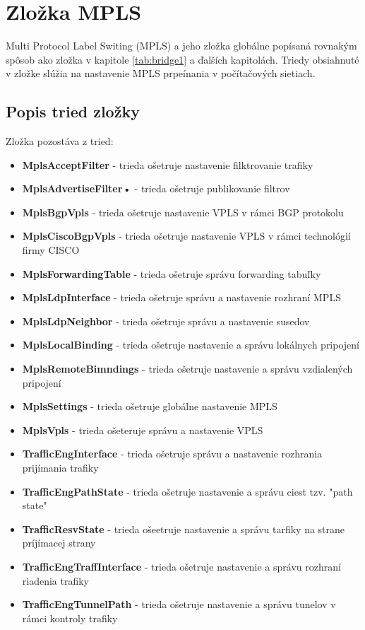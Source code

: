 \section{Zložka MPLS}
Multi Protocol Label Switing (MPLS) a jeho zložka globálne popísaná rovnakým spôsob ako zložka v kapitole \ref{tab:bridge1} a ďalších kapitolách. Triedy obsiahnuté v zložke slúžia na nastavenie MPLS prpeínania v počítačových sietiach.
\subsection{Popis tried zložky}
Zložka pozostáva z tried:
\begin{itemize}
\item \textbf{MplsAcceptFilter} - trieda ošetruje nastavenie  filktrovanie trafiky
\item \textbf{MplsAdvertiseFilter\textbf{•}} - trieda ošetruje publikovanie filtrov
\item \textbf{MplsBgpVpls} - trieda ošetruje nastavenie VPLS v rámci  BGP protokolu
\item \textbf{MplsCiscoBgpVpls} - trieda ošetruje nastavenie VPLS v rámci technológií firmy CISCO
\item \textbf{MplsForwardingTable} - trieda ošetruje správu forwarding tabuľky
\item \textbf{MplsLdpInterface} - trieda ošetruje správu a nastavenie rozhraní MPLS
\item \textbf{MplsLdpNeighbor} - trieda ošetruje správu a nastavenie susedov
\item \textbf{MplsLocalBinding} - trieda ošetruje nastavenie  a správu lokálnych pripojení
\item \textbf{MplsRemoteBimndings} - trieda ošetruje nastavenie a správu vzdialených pripojení
\item \textbf{MplsSettings} - trieda ošetruje globálne nastavenie MPLS
\item \textbf{MplsVpls} - trieda ošeteruje správu a nastavenie VPLS
\item \textbf{TrafficEngInterface} - trieda ošetruje správu a nastavenie rozhrania prijímania trafiky
\item \textbf{TrafficEngPathState} - trieda ošetruje nastavenie a správu ciest tzv. "path state"
\item \textbf{TrafficResvState} - trieda ošeetruje nastavenie a správu tarfiky na strane príjímacej strany
\item \textbf{TrafficEngTraffInterface} - trieda ošetruje nastavenie a správu rozhraní riadenia trafiky
\item \textbf{TrafficEngTunnelPath} - trieda ošetruje nastavenie  a správu tunelov v rámci kontroly trafiky
\end{itemize}

